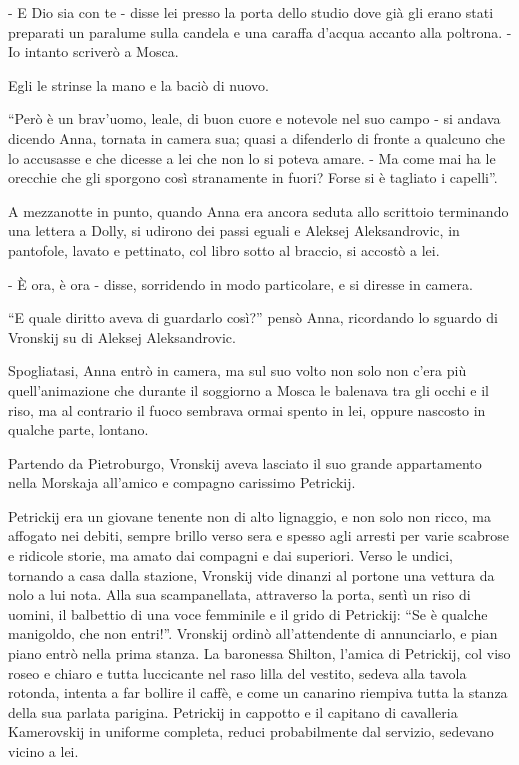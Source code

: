 - E Dio sia con te - disse lei presso la porta dello studio dove già gli erano stati preparati un paralume sulla candela e una caraffa d'acqua accanto alla poltrona. - Io intanto scriverò a Mosca. 

Egli le strinse la mano e la baciò di nuovo. 

``Però è un brav'uomo, leale, di buon cuore e notevole nel suo campo - si andava dicendo Anna, tornata in camera sua; quasi a difenderlo di fronte a qualcuno che lo accusasse e che dicesse a lei che non lo si poteva amare. - Ma come mai ha le orecchie che gli sporgono così stranamente in fuori? Forse si è tagliato i capelli''. 

A mezzanotte in punto, quando Anna era ancora seduta allo scrittoio terminando una lettera a Dolly, si udirono dei passi eguali e Aleksej Aleksandrovic, in pantofole, lavato e pettinato, col libro sotto al braccio, si accostò a lei. 

- È ora, è ora - disse, sorridendo in modo particolare, e si diresse in camera. 

``E quale diritto aveva di guardarlo così?'' pensò Anna, ricordando lo sguardo di Vronskij su di Aleksej Aleksandrovic. 

Spogliatasi, Anna entrò in camera, ma sul suo volto non solo non c'era più quell'animazione che durante il soggiorno a Mosca le balenava tra gli occhi e il riso, ma al contrario il fuoco sembrava ormai spento in lei, oppure nascosto in qualche parte, lontano. 

\label{xxxiv} 

Partendo da Pietroburgo, Vronskij aveva lasciato il suo grande appartamento nella Morskaja all'amico e compagno carissimo Petrickij. 

Petrickij era un giovane tenente non di alto lignaggio, e non solo non ricco, ma affogato nei debiti, sempre brillo verso sera e spesso agli arresti per varie scabrose e ridicole storie, ma amato dai compagni e dai superiori. Verso le undici, tornando a casa dalla stazione, Vronskij vide dinanzi al portone una vettura da nolo a lui nota. Alla sua scampanellata, attraverso la porta, sentì un riso di uomini, il balbettio di una voce femminile e il grido di Petrickij: ``Se è qualche manigoldo, che non entri!''. Vronskij ordinò all'attendente di annunciarlo, e pian piano entrò nella prima stanza. La baronessa Shilton, l'amica di Petrickij, col viso roseo e chiaro e tutta luccicante nel raso lilla del vestito, sedeva alla tavola rotonda, intenta a far bollire il caffè, e come un canarino riempiva tutta la stanza della sua parlata parigina. Petrickij in cappotto e il capitano di cavalleria Kamerovskij in uniforme completa, reduci probabilmente dal servizio, sedevano vicino a lei. 

